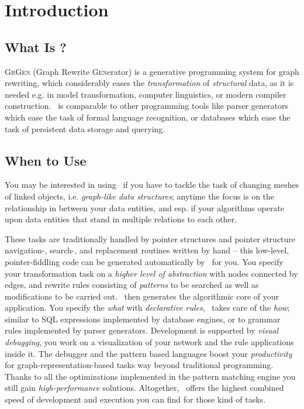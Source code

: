 \chapter{Introduction}
\label{chp:intro}


\section{What Is \GrG?}

{\scshape GrGen} (\textsc{G}raph \textsc{R}ewrite \textsc{Gen}erator) is a generative programming system for graph rewriting,
which considerably eases the \emph{transformation} of \emph{structural} data,
as it is needed e.g. in model transformation, computer linguistics, or modern compiler construction.
\GrG\ is comparable to other programming tools like parser generators which ease the task of formal language recognition,
or databases which ease the task of persistent data storage and querying.


\section{When to Use \GrG}
You may be interested in using \GrG\ if you have to tackle the task of changing meshes of linked objects, i.e. \emph{graph-like data structures};
anytime the focus is on the relationship in between your data entities,
and esp. if your algorithms operate upon data entities that stand in multiple relations to each other.

These tasks are traditionally handled by pointer structures and pointer structure navi\-gation-, search-, and replacement routines written by hand
-- this low-level, pointer-fiddling code can be generated automatically by \GrG\ for you.
You specify your transformation task on a \emph{higher level of abstraction} with nodes connected by edges,
and rewrite rules consisting of \emph{patterns} to be searched as well as modifications to be carried out.
\GrG\ then generates the algorithmic core of your application.
You specify the \emph{what} with \emph{declarative rules}, \GrG\ takes care of the \emph{how};
similar to SQL expressions implemented by database engines, 
or to grammar rules implemented by parser generators.
Development is supported by \emph{visual debugging}, you work on a visualization of your network and the rule applications inside it.
The debugger and the pattern based languages boost your \emph{productivity} for graph-representation-based tasks way beyond traditional programming.
Thanks to all the optimizations implemented in the pattern matching engine you still gain \emph{high-performance} solutions.
Altogether, \GrG\ offers the highest combined speed of development and execution you can find for those kind of tasks.


